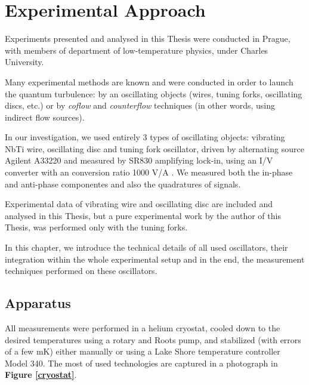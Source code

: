 \chapter{Experimental Approach}

Experiments presented and analysed in this Thesis were conducted in Prague, with members of department of low-temperature physics, under Charles University.

Many experimental methods are known and were conducted in order to launch the quantum turbulence: by an oscillating objects (wires, tuning forks, oscillating discs, etc.) or by \textit{coflow} and \textit{counterflow} techniques (in other words, using indirect flow sources).

In our investigation, we used entirely 3 types of oscillating objects: vibrating NbTi wire, oscillating disc and tuning fork oscillator, driven by alternating source Agilent A33220 and measured by SR830 amplifying lock-in, using an I/V converter with an conversion ratio 1000 V/A \cite{skyba}. We measured both the in-phase and anti-phase componentes and also the quadratures of signals.

Experimental data of vibrating wire and oscillating disc are included and analysed in this Thesis, but a pure experimental work by the author of this Thesis, was performed only with the tuning forks.

In this chapter, we introduce the technical details of all used oscillators, their integration within the whole experimental setup and in the end, the measurement techniques performed on these oscillators.

\newpage

\section{Apparatus}

All measurements were performed in a helium cryostat, cooled down to the desired temperatures using a rotary and Roots pump, and stabilized (with errors of a few mK) either manually or using a Lake Shore temperature controller Model 340. The most of used technologies are captured in a photograph in \textbf{Figure \ref{cryostat}}.

